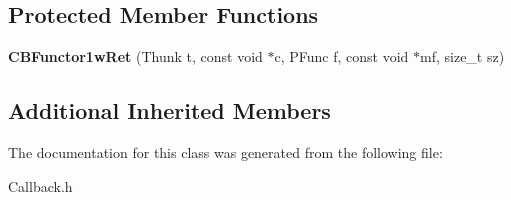 \subsection*{Protected Member Functions}
\begin{DoxyCompactItemize}
\item 
{\bfseries C\+B\+Functor1w\+Ret} (Thunk t, const void $\ast$c, P\+Func f, const void $\ast$mf, size\+\_\+t sz)\label{classCBFunctor1wRet_a16b528d689792b58a510a5e7fff23e7c}

\end{DoxyCompactItemize}
\subsection*{Additional Inherited Members}


The documentation for this class was generated from the following file\+:\begin{DoxyCompactItemize}
\item 
Callback.\+h\end{DoxyCompactItemize}
